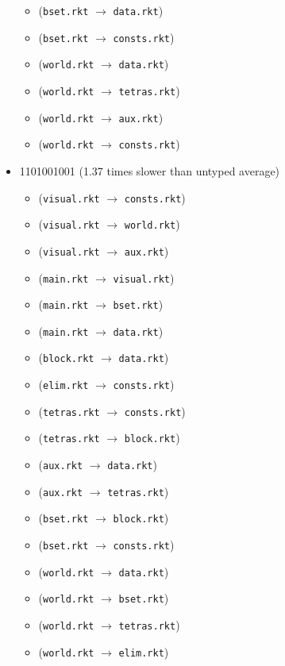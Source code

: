 \documentclass{article}
\newcommand{\mono}[1]{\texttt{#1}}
\begin{document}
\begin{itemize}
\begin{itemize}
  \item (\mono{bset.rkt} $\rightarrow$ \mono{data.rkt})
  \item (\mono{bset.rkt} $\rightarrow$ \mono{consts.rkt})
  \item (\mono{world.rkt} $\rightarrow$ \mono{data.rkt})
  \item (\mono{world.rkt} $\rightarrow$ \mono{tetras.rkt})
  \item (\mono{world.rkt} $\rightarrow$ \mono{aux.rkt})
  \item (\mono{world.rkt} $\rightarrow$ \mono{consts.rkt})
  \end{itemize}
\item 1101001001 (1.37 times slower than untyped average)
  \begin{itemize}
  \item (\mono{visual.rkt} $\rightarrow$ \mono{consts.rkt})
  \item (\mono{visual.rkt} $\rightarrow$ \mono{world.rkt})
  \item (\mono{visual.rkt} $\rightarrow$ \mono{aux.rkt})
  \item (\mono{main.rkt} $\rightarrow$ \mono{visual.rkt})
  \item (\mono{main.rkt} $\rightarrow$ \mono{bset.rkt})
  \item (\mono{main.rkt} $\rightarrow$ \mono{data.rkt})
  \item (\mono{block.rkt} $\rightarrow$ \mono{data.rkt})
  \item (\mono{elim.rkt} $\rightarrow$ \mono{consts.rkt})
  \item (\mono{tetras.rkt} $\rightarrow$ \mono{consts.rkt})
  \item (\mono{tetras.rkt} $\rightarrow$ \mono{block.rkt})
  \item (\mono{aux.rkt} $\rightarrow$ \mono{data.rkt})
  \item (\mono{aux.rkt} $\rightarrow$ \mono{tetras.rkt})
  \item (\mono{bset.rkt} $\rightarrow$ \mono{block.rkt})
  \item (\mono{bset.rkt} $\rightarrow$ \mono{consts.rkt})
  \item (\mono{world.rkt} $\rightarrow$ \mono{data.rkt})
  \item (\mono{world.rkt} $\rightarrow$ \mono{bset.rkt})
  \item (\mono{world.rkt} $\rightarrow$ \mono{tetras.rkt})
  \item (\mono{world.rkt} $\rightarrow$ \mono{elim.rkt})
  \end{itemize}

\end{itemize}
\end{document}
